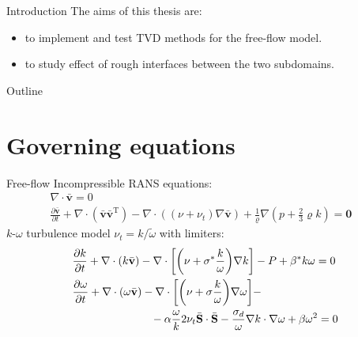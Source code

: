 \documentclass{beamer}
\begin{document}
\begin{frame}{Introduction}
The aims of this thesis are:
\begin{itemize}
	\item to implement and test TVD methods for the free-flow model.
	\item to study effect of rough interfaces between the two subdomains.
\end{itemize}
\end{frame}
\begin{frame}{Outline}
	\tableofcontents
\end{frame}
\section{Governing equations}
\begin{frame}{Free-flow}
Incompressible RANS equations:
\begin{align*}
\nabla \cdot \bar{\mathbf{v}} = 0&\\
\frac{\partial \bar{\mathbf{v}}}{\partial t} + \nabla 
\cdot (\bar{\mathbf{v}} \bar{\mathbf{v}}^\mathrm{T}) - \nabla \cdot 
((\nu + \nu_t) \nabla \bar{\mathbf{v}}) + \frac{1}{\varrho}\nabla (p + \frac{2}{3}\varrho k) = \mathbf{0}&
\end{align*}
$k\text{-}\omega$ turbulence model $\nu_t = k / \tilde{\omega}$ with limiters:
\begin{align*}
&\frac{\partial k}{\partial t} + \nabla \cdot (k\bar{\mathbf{v}}) - \nabla \cdot
\bigg[\bigg(\nu + \sigma^*\frac{k}{\omega}\bigg) \nabla k\bigg] -P + \beta^* k 
\omega = 0\\
&\frac{\partial \omega}{\partial t} + \nabla \cdot (\omega \bar{\mathbf{v}}) - 
\nabla \cdot \bigg[ \bigg( \nu + \sigma \frac{k}{\omega} \bigg) \nabla \omega 
\bigg]-\\
&\hspace{2.5cm}- \alpha \frac{\omega}{k} 2 \nu_t \bar{\mathbf{S}} \cdot \bar{\mathbf{S}} 
-\frac{\sigma_d}{\omega} \nabla k \cdot 
\nabla \omega+ \beta \omega^2 = 0
\end{align*}
\end{frame}
\end{document}
